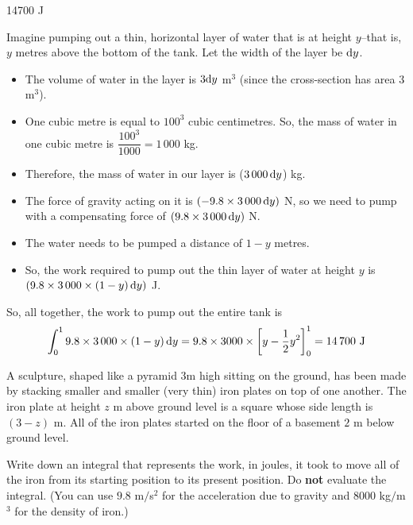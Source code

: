 \begin{answer}
14700 J
\end{answer}
\begin{solution}
Imagine pumping out a thin, horizontal  layer of water that is at height $y$--that is, $y$ metres above the bottom of the tank. Let the width of the layer be $\mathrm{d}y$.
\begin{center}
\end{center}
\begin{itemize}
\item The volume of water in the layer is $3\mathrm{d}y$ m$^3$ (since the cross-section has area 3 m$^3$).
\item One cubic metre is equal to $100^3$ cubic centimetres. So, the mass of water in one cubic metre is $\dfrac{100^3}{1000} = 1\,000$ kg.
\item Therefore, the mass of water in our layer is ($3\,000\,\mathrm{d}y$) kg.
\item  The force of gravity acting on it is $(-9.8 \times 3\,000\,\mathrm{d}y)$ N, so we need to pump with a compensating force of $(9.8 \times 3\,000\,\mathrm{d}y)$ N.
\item  The water needs to be pumped a distance of $1-y$ metres.
\item So, the work required to pump out the thin layer of water at height $y$ is $(9.8 \times 3\,000\times(1-y)\,\mathrm{d}y)$ J.
\end{itemize}
So, all together, the work to pump out the entire tank is
\[\int_0^19.8 \times 3\,000\times(1-y)\,\mathrm{d}y  = 9.8 \times 3000 \times \left[y-\frac{1}{2}y^2\right]_0^1=14\,700 \text{ J}\]
\end{solution}

\begin{question}[2015A]
A sculpture, shaped like a pyramid $3$m high sitting on the ground, has been made by
stacking smaller and smaller (very thin) iron plates on top of one another. The iron plate
at height $z$ m above ground level is a square whose side length is $(3-z)$ m. All of
the iron plates started on the floor of a basement $2$ m below ground level.

Write down an integral that represents the work, in joules, it took to move all of the
iron from its starting position to its present position. Do {\bf not} evaluate the
integral. (You can use $9.8$ m${}/{}$s${}^2$ for the acceleration due to gravity and
$8000$  kg${}/{}$m${}^3$ for the density of iron.)
\end{question}

